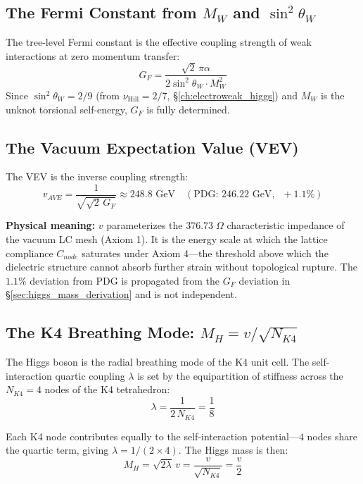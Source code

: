 \subsection{The Fermi Constant from $M_W$ and $\sin^2\theta_W$}

The tree-level Fermi constant is the effective coupling strength of weak interactions at zero momentum transfer:
\begin{equation}
    G_F = \frac{\sqrt{2}\,\pi\alpha}{2\sin^2\theta_W \cdot M_W^2}
\end{equation}
Since $\sin^2\theta_W = 2/9$ (from $\nu_{\text{Hill}} = 2/7$, \S\ref{ch:electroweak_higgs}) and $M_W$ is the unknot torsional self-energy, $G_F$ is fully determined.

\subsection{The Vacuum Expectation Value (VEV)}

The VEV is the inverse coupling strength:
\begin{equation}
    v_{AVE} = \frac{1}{\sqrt{\sqrt{2}\,G_F}} \approx 248.8 \text{ GeV}
    \quad (\text{PDG: } 246.22 \text{ GeV},\;\; +1.1\%)
\end{equation}

\noindent\textbf{Physical meaning:} $v$ parameterizes the $376.73\;\Omega$ characteristic impedance of the vacuum LC mesh (Axiom 1). It is the energy scale at which the lattice compliance $C_{node}$ saturates under Axiom 4---the threshold above which the dielectric structure cannot absorb further strain without topological rupture. The $1.1\%$ deviation from PDG is propagated from the $G_F$ deviation in \S\ref{sec:higgs_mass_derivation} and is not independent.

\subsection{The K4 Breathing Mode: $M_H = v/\sqrt{N_{K4}}$}

The Higgs boson is the radial breathing mode of the K4 unit cell. The self-interaction quartic coupling $\lambda$ is set by the equipartition of stiffness across the $N_{K4} = 4$ nodes of the K4 tetrahedron:
\begin{equation}
    \lambda = \frac{1}{2\,N_{K4}} = \frac{1}{8}
\end{equation}

Each K4 node contributes equally to the self-interaction potential---$4$ nodes share the quartic term, giving $\lambda = 1/(2 \times 4)$. The Higgs mass is then:
\begin{equation}
    M_H = \sqrt{2\lambda}\,v = \frac{v}{\sqrt{N_{K4}}} = \frac{v}{2}
\end{equation}

